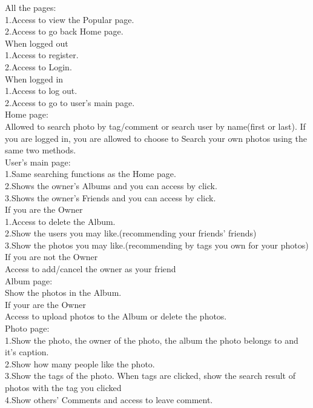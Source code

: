 \documentclass[11pt, oneside]{article}   	%
\begin{document}
All the pages:\\[0.1cm]
1.Access to view the Popular page.\\
2.Access to go back Home page.\\
When logged out\\[0.1cm]
1.Access to register.\\
2.Access to Login.\\
When logged in\\[0.1cm]
1.Access to log out.\\
2.Access to go to user's main page.\\[0.3cm]
Home page:\\[0.1cm]
Allowed to search photo by tag/comment or search user by name(first or last). If you are logged in, you are allowed to choose to Search your own photos using the same two methods.\\[0.3cm]
User's main page:\\[0.1cm]
1.Same searching functions as the Home page.\\
2.Shows the owner's Albums and you can access by click.\\
3.Shows the owner's Friends and you can access by click.\\
If you are the Owner\\[0.1cm]
1.Access to delete the Album.\\
2.Show the users you may like.(recommending your friends' friends)\\
3.Show the photos you may like.(recommending by tags you own for your photos)\\
If you are not the Owner\\[0.1cm]
Access to add/cancel the owner as your friend\\[0.3cm]
Album page:\\[0.1cm]
Show the photos in the Album.\\
If your are the Owner\\[0.1cm]
Access to upload photos to the Album or delete the photos.\\[0.3cm]
Photo page:\\[0.1cm]
1.Show the photo, the owner of the photo, the album the photo belongs to and it's caption.\\
2.Show how many people like the photo.\\
3.Show the tags of the photo. When tags are clicked, show the search result of photos with the tag you clicked\\
4.Show others' Comments and access to leave comment.\\
\end{document}
